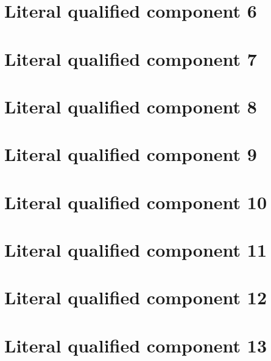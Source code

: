 \documentclass[11pt]{article}
\begin{document}
\section{Literal qualified component 6}
\begin{GrantBody}

\end{GrantBody}

\section{Literal qualified component 7}
\begin{GrantBody}

\end{GrantBody}

\section{Literal qualified component 8}
\begin{GrantBody}

\end{GrantBody}

\section{Literal qualified component 9}
\begin{GrantBody}

\end{GrantBody}

\section{Literal qualified component 10}
\begin{GrantBody}

\end{GrantBody}

\section{Literal qualified component 11}
\begin{GrantBody}

\end{GrantBody}

\section{Literal qualified component 12}
\begin{GrantBody}

\end{GrantBody}

\section{Literal qualified component 13}
\begin{GrantBody}

\end{GrantBody}
\end{document}
